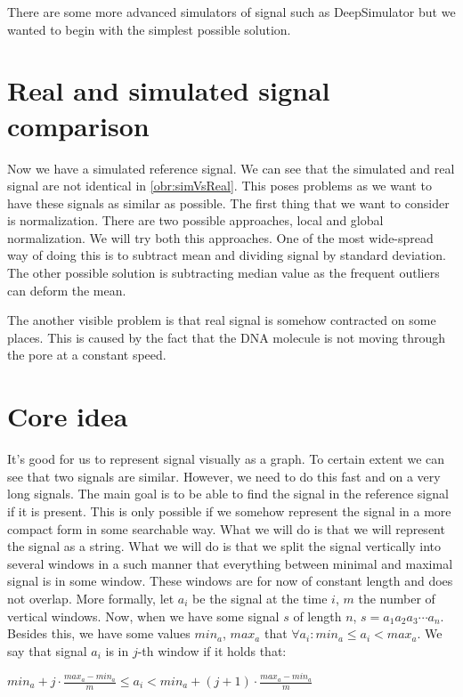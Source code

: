 There are some more advanced simulators of signal such as DeepSimulator but we
wanted to begin with the simplest possible solution.

\section{Real and simulated signal comparison}

Now we have a simulated reference signal. We can see that the simulated and real
signal are not identical in \ref{obr:simVsReal}. This poses problems as we want to have these signals as
similar as possible. The first thing that we want to consider is normalization. There
are two possible approaches, local and global normalization. We will try both this
approaches. One of the most wide-spread way of doing this is to subtract mean and dividing
signal by standard deviation. The other possible solution is subtracting median value
as the frequent outliers can deform the mean. 

The another visible problem is that real signal is somehow contracted
on some places. This is caused by the fact that the DNA molecule is not moving
through the pore at a constant speed. 

\section{Core idea}

It's good for us to represent signal visually as a graph. To certain extent we
can see that two signals are similar. However, we need to do this fast and on a very
long signals. The main goal is to be able to find the signal in the reference
signal if it is present. This is only possible if we somehow represent the signal
in a more compact form in some searchable way. What we will do is that we will
represent the signal as a string. What we will do is that we split the signal vertically
into several windows in a such manner that everything between minimal and maximal
signal is in some window. These windows are for now of constant length and does not
overlap. More formally, let $a_i$ be the signal at the time $i$, $m$ the number of
vertical windows. Now, when we have some signal $s$ of length $n$, $s=a_1a_2a_3\cdots a_n$.
Besides this, we have some values $min_a$, $max_a$ that $\forall a_i: min_a \leq a_i < max_a$. We say that signal $a_i$ is in $j$-th
window if it holds that:

\begin{center}
$min_a + j\cdot \frac{max_a-min_a}{m} \leq a_i < min_a + (j+1)\cdot \frac{max_a-min_a}{m}$
\end{center}

